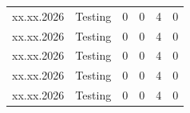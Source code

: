 \begin{landscape}
\begin{longtable}[c]{lp{10cm}rrrr}
		xx.xx.2026
		     & Testing
		     & 0                                                                                                                   %
		     & 0                                                                                                                   %
		     & 4                                                                                                                   %
		     & 0                                                                                                                   \\ %

		xx.xx.2026
		     & Testing
		     & 0                                                                                                                   %
		     & 0                                                                                                                   %
		     & 4                                                                                                                   %
		     & 0                                                                                                                   \\ %

		xx.xx.2026
		     & Testing
		     & 0                                                                                                                   %
		     & 0                                                                                                                   %
		     & 4                                                                                                                   %
		     & 0                                                                                                                   \\ %

		xx.xx.2026
		     & Testing
		     & 0                                                                                                                   %
		     & 0                                                                                                                   %
		     & 4                                                                                                                   %
		     & 0                                                                                                                   \\ %

		xx.xx.2026
		     & Testing
		     & 0                                                                                                                   %
		     & 0                                                                                                                   %
		     & 4                                                                                                                   %
		     & 0                                                                                                                   \\ %


\end{longtable}
\end{landscape}
